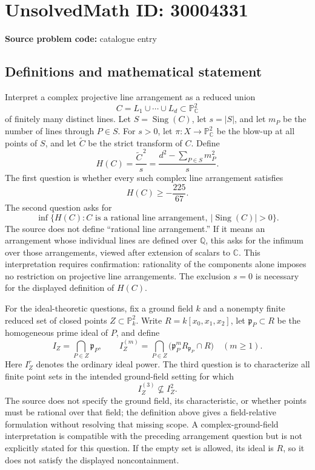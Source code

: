 \documentclass[11pt]{article}
\newcommand{\Q}{\mathbb{Q}}
\newcommand{\C}{\mathbb{C}}
\newcommand{\PP}{\mathbb{P}}
\begin{document}
\section*{UnsolvedMath ID: 30004331}
\textbf{Source problem code:} catalogue entry
\subsection{Definitions and mathematical statement}
Interpret a complex projective line arrangement as a reduced union
\[
C=L_1\cup\cdots\cup L_d\subset\PP^2_{\C}
\]
of finitely many distinct lines. Let \(S=\operatorname{Sing}(C)\), let \(s=|S|\), and let \(m_P\) be the number of lines through \(P\in S\). For \(s>0\), let \(\pi:X\to\PP^2_{\C}\) be the blow-up at all points of \(S\), and let \(\widetilde C\) be the strict transform of \(C\). Define
\[
H(C)=\frac{\widetilde C^{\,2}}{s}
     =\frac{d^2-\sum_{P\in S}m_P^2}{s}.
\]
The first question is whether every such complex line arrangement satisfies
\[
H(C)\ge -\frac{225}{67}.
\]
The second question asks for
\[
\inf\{H(C):C\text{ is a rational line arrangement},\ |\operatorname{Sing}(C)|>0\}.
\]
The source does not define ``rational line arrangement.'' If it means an arrangement whose individual lines are defined over \(\Q\), this asks for the infimum over those arrangements, viewed after extension of scalars to \(\C\). This interpretation requires confirmation: rationality of the components alone imposes no restriction on projective line arrangements. The exclusion \(s=0\) is necessary for the displayed definition of \(H(C)\).

For the ideal-theoretic questions, fix a ground field \(k\) and a nonempty finite reduced set of closed points \(Z\subset\PP^2_k\). Write \(R=k[x_0,x_1,x_2]\), let \(\mathfrak p_P\subset R\) be the homogeneous prime ideal of \(P\), and define
\[
I_Z=\bigcap_{P\in Z}\mathfrak p_P,
\qquad
I_Z^{(m)}=\bigcap_{P\in Z}\bigl(\mathfrak p_P^mR_{\mathfrak p_P}\cap R\bigr)
\quad(m\ge1).
\]
Here \(I_Z^r\) denotes the ordinary ideal power. The third question is to characterize all finite point sets in the intended ground-field setting for which
\[
I_Z^{(3)}\not\subseteq I_Z^2.
\]
The source does not specify the ground field, its characteristic, or whether points must be rational over that field; the definition above gives a field-relative formulation without resolving that missing scope. A complex-ground-field interpretation is compatible with the preceding arrangement question but is not explicitly stated for this question. If the empty set is allowed, its ideal is \(R\), so it does not satisfy the displayed noncontainment.
\end{document}

